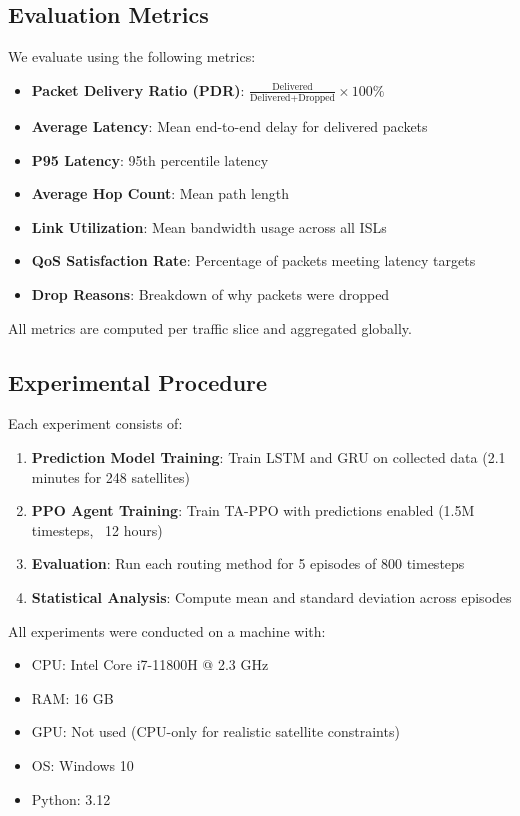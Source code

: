 \subsection{Evaluation Metrics}

We evaluate using the following metrics:

\begin{itemize}
\item \textbf{Packet Delivery Ratio (PDR)}: $\frac{\text{Delivered}}{\text{Delivered} + \text{Dropped}} \times 100\%$
\item \textbf{Average Latency}: Mean end-to-end delay for delivered packets
\item \textbf{P95 Latency}: 95th percentile latency
\item \textbf{Average Hop Count}: Mean path length
\item \textbf{Link Utilization}: Mean bandwidth usage across all ISLs
\item \textbf{QoS Satisfaction Rate}: Percentage of packets meeting latency targets
\item \textbf{Drop Reasons}: Breakdown of why packets were dropped
\end{itemize}

All metrics are computed per traffic slice and aggregated globally.

\subsection{Experimental Procedure}

Each experiment consists of:

\begin{enumerate}
\item \textbf{Prediction Model Training}: Train LSTM and GRU on collected data (2.1 minutes for 248 satellites)
\item \textbf{PPO Agent Training}: Train TA-PPO with predictions enabled (1.5M timesteps, ~12 hours)
\item \textbf{Evaluation}: Run each routing method for 5 episodes of 800 timesteps
\item \textbf{Statistical Analysis}: Compute mean and standard deviation across episodes
\end{enumerate}

All experiments were conducted on a machine with:
\begin{itemize}
\item CPU: Intel Core i7-11800H @ 2.3 GHz
\item RAM: 16 GB
\item GPU: Not used (CPU-only for realistic satellite constraints)
\item OS: Windows 10
\item Python: 3.12
\end{itemize}


